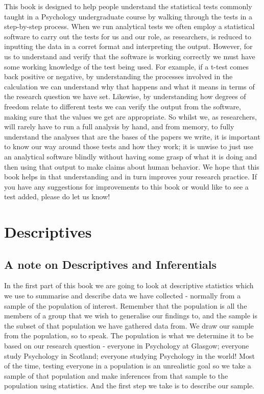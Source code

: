 \documentclass[
  oneside]{book}
\begin{document}
This book is designed to help people understand the statistical tests commonly taught in a Psychology undergraduate course by walking through the tests in a step-by-step process. When we run analytical tests we often employ a statistical software to carry out the tests for us and our role, as researchers, is reduced to inputting the data in a corret format and interpreting the output. However, for us to understand and verify that the software is working correctly we must have some working knowledge of the test being used. For example, if a t-test comes back positive or negative, by understanding the processes involved in the calculation we can understand why that happens and what it means in terms of the research question we have set. Likewise, by understanding how degrees of freedom relate to different tests we can verify the output from the software, making sure that the values we get are appropriate. So whilst we, as researchers, will rarely have to run a full analysis by hand, and from memory, to fully understand the analyses that are the bases of the papers we write, it is important to know our way around those tests and how they work; it is unwise to just use an analytical software blindly without having some grasp of what it is doing and then using that output to make claims about human behavior. We hope that this book helps in that understanding and in turn improves your research practice. If you have any suggestions for improvements to this book or would like to see a test added, please do let us know!

\hypertarget{descriptives}{%
\chapter{Descriptives}\label{descriptives}}

\hypertarget{a-note-on-descriptives-and-inferentials}{%
\section{A note on Descriptives and Inferentials}\label{a-note-on-descriptives-and-inferentials}}

In the first part of this book we are going to look at descriptive statistics which we use to summarise and describe data we have collected - normally from a sample of the population of interest. Remember that the population is all the members of a group that we wish to generalise our findings to, and the sample is the subset of that population we have gathered data from. We draw our sample from the population, so to speak. The population is what we determine it to be based on our research question - everyone in Psychology at Glasgow; everyone study Psychology in Scotland; everyone studying Psychology in the world! Most of the time, testing everyone in a population is an unrealistic goal so we take a sample of that population and make inferences from that sample to the population using statistics. And the first step we take is to describe our sample.
\end{document}
